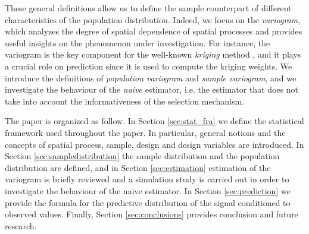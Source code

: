 These general definitions allow us to define the sample counterpart of different characteristics of the population distribution. Indeed, we focus on the \emph{variogram}, which analyzes the degree of spatial dependence of spatial processes and provides useful insights on the phenomenon under investigation. For instance, the variogram is the key component for the well-known \emph{kriging} method \citep{matheron1962traite}, and it plays a crucial role on prediction since it is used to compute the kriging weights. We introduce the definitions of \emph{population variogram} and \emph{sample variogram}, and we investigate the behaviour of the \emph{naive} estimator, i.e. the estimator that does not take into account the informativeness of the selection mechanism.


The paper is organized as follow. In Section \ref{sec:stat_fra} we define the statistical framework used throughout the paper. In particular, general notions and the concepts of spatial process, sample, design and design variables are introduced. In Section \ref{sec:sampledistribution} the sample distribution and the population distribution are defined, and in Section \ref{sec:estimation} estimation of the variogram is briefly reviewed and a  simulation study is carried out in order to investigate the behaviour of the naive estimator. In Section \ref{sec:prediction} we provide the formula for the predictive distribution of the signal conditioned to observed values. Finally, Section \ref{sec:conclusions} provides conclusion and future research.



